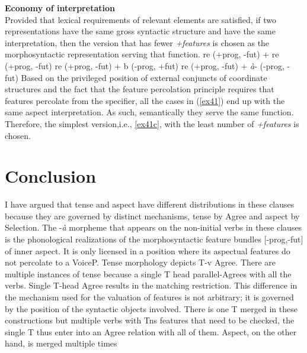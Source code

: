 \documentclass[output=paper,
modfonts
]{langscibook}
\begin{document}
\ea
\textbf{Economy of interpretation}\\Provided that lexical requirements of relevant elements are satisfied, if two representations have the same gross syntactic structure and have the same interpretation, then the version that has fewer \emph{+features} is chosen as the morphosyntactic representation serving that function.
\z
\ea \label{ex41}
\ea  *re  (+prog, -fut) + re  (+prog, -fut)  
\ex *re (+prog, -fut) + b (-prog, +fut)
	\ex \label{ex41c} re (+prog, -fut) + \emph{\`a}- (-prog, -fut)
\z
\z
Based on the privileged position of external conjuncts of coordinate structures and the fact that the feature percolation principle requires that features percolate from the specifier, all the cases in (\ref{ex41}) end up with the same aspect interpretation. As such, semantically they serve the same function. Therefore, the simplest version,i.e., \ref{ex41c}, with the least number of \emph{+features} is chosen. 


\section{Conclusion}
I have argued that tense and aspect have different distributions in these clauses because they are governed by distinct mechanisms, tense by Agree and aspect by Selection. The -\emph{\`a} morpheme that appears on the non-initial verbs in these clauses is the phonological realizations of the morphosyntactic feature bundles [-prog,-fut] of inner aspect. It is only licensed in a position where its aspectual features do not percolate to a VoiceP. Tense morphology depicts T-v Agree. There are multiple instances of tense because a single T head parallel-Agrees with all the verbs. Single T-head Agree results in the matching restriction. This difference in the mechanism used for the valuation of features is not arbitrary; it is governed by the position of the syntactic objects involved. There is one T merged in these constructions but multiple verbs with Tns features that need to be checked, the single T thus enter into an Agree relation with all of them.  Aspect, on the other hand,  is merged multiple times 



\end{document}
